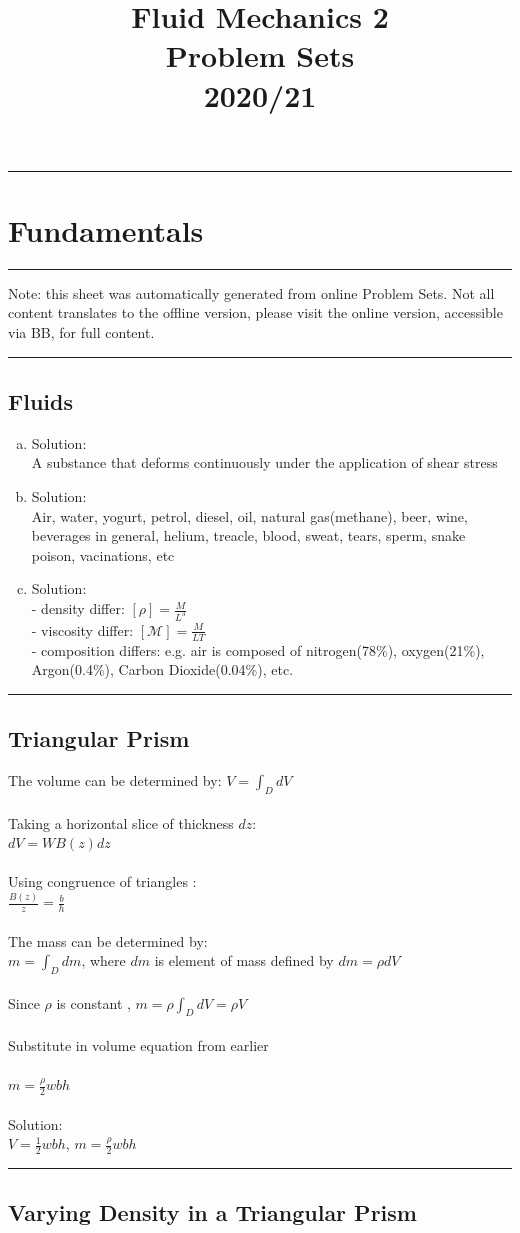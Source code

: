 \documentclass[11pt,a4paper]{article}%
\title{Fluid Mechanics 2\\Problem Sets \\2020/21}
\date{}
\newcommand{\ETrule}{
\begin{center}%
\rule[2.5pt]{\linewidth}{.5pt}%
\end{center}}%
\begin{document}
\ETrule\setcounter{section}{0}\section{Fundamentals}\ETrule Note: this sheet was automatically generated from online Problem Sets. Not all content translates to the offline version, please visit the online version, accessible via BB, for full content.\ETrule\subsection{Fluids}
\begin{enumerate}[(a)]\item Solution:\\A substance that deforms continuously under the application of shear stress\item Solution:\\Air, water, yogurt, petrol, diesel, oil, natural gas(methane), beer, wine, beverages in general, helium, treacle, blood, sweat, tears, sperm, snake poison, vacinations, etc\item Solution:\\- density differ: \([\rho ]=\frac{M}{{L}^{3}}\) \\ - viscosity differ: \([\mathcal{M}]=\frac{M}{LT}\)\\ - composition differs: e.g. air is composed of nitrogen(78\%), oxygen(21\%), Argon(0.4\%), Carbon Dioxide(0.04\%), etc.\end{enumerate}\ETrule\subsection{Triangular Prism}
The volume can be determined by: \(V=\int_{D}^{}dV\)\\\\Taking a horizontal slice of thickness \(dz\): \\\(dV=WB(z)dz\)\\\\Using congruence of triangles : \\\(\frac{B(z)}{z}=\frac{b}{h}\)\\\\The mass can be determined by:\\\(m=\int_{D}^{}dm\), where \(dm\) is element of mass defined by \(dm=\rho dV\)\\\\Since \(\rho\) is constant , \(m=\rho\int_{D}^{}dV=\rho V\)\\\\Substitute in volume equation from earlier\\\\\(m=\frac{\rho}{2}wbh\)\\\\Solution:\\\(V=\frac{1}{2}wbh\), \(m=\frac{\rho}{2}wbh\)\ETrule\subsection{Varying Density in a Triangular Prism}
\end{document}
